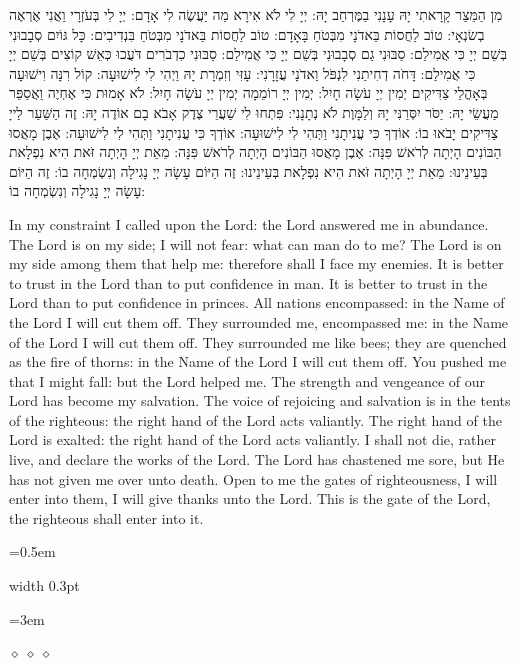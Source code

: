\documentclass[11pt, openany]{book}
\newlength{\bidiHebWidth}
\newlength{\bidiEngWidth}
\newenvironment{bilingual}{%
  \par\vspace{4pt}%
}{%
  \noindent
  \begin{minipage}[t]{\bidiEngWidth}
    \setstretch{1.4}\emergencystretch=0.5em\normalsize
    \usebox{\bidiEngBox}
  \end{minipage}%
  \hfill
  {\color{sedergold}\vrule width 0.3pt}%
  \hfill
  \begin{minipage}[t]{\bidiHebWidth}
    \begingroup\hebrewfont\TeXXeTstate=1\beginR
    \large\setstretch{1.4}\emergencystretch=3em\tolerance=9999\parindent=0pt\relax
    \usebox{\bidiHebBox}
    \endR\endgroup
  \end{minipage}%
  \par\vspace{2pt}%
}
\newenvironment{hebrewcol}{%
  \begin{lrbox}{\bidiHebBox}\begin{minipage}{\bidiHebWidth}%
}{%
  \end{minipage}\end{lrbox}%
}
\newenvironment{englishcol}{%
  \begin{lrbox}{\bidiEngBox}\begin{minipage}{\bidiEngWidth}%
}{%
  \end{minipage}\end{lrbox}%
}
\newcommand{\parasep}{%
  \par\vspace{3pt}
  \begin{center}
    \textcolor{sedergold!50}{\tiny$\diamond\;\diamond\;\diamond$}
  \end{center}
  \par\vspace{3pt}
}
\begin{document}
\begin{bilingual}
\begin{hebrewcol}
מִן הַמֵּצַר קָרָאתִי יָהּ עָנָנִי בַמֶּרְחַב יָהּ: יְיָ לִי לֹא אִירָא מַה יַּעֲשֶׂה לִי אָדָם: יְיָ לִי בְּעֹזְרָי וַאֲנִי אֶרְאֶה בְשׂנְאָי: טוֹב לַחֲסוֹת בַּאדֹנָי מִבְּטֹחַ בָּאָדָם: טוֹב לַחֲסוֹת בַּאדֹנָי מִבְּטֹחַ בִּנְדִיבִים: כָּל גּוֹיִם סְבָבוּנִי בְּשֵׁם יְיָ כִּי אֲמִילַם: סַבּוּנִי גַם סְבָבוּנִי בְּשֵׁם יְיָ כִּי אֲמִילַם: סַבּוּנִי כִדְבֹרִים דֹּעֲכוּ כְּאֵשׁ קוֹצִים בְּשֵׁם יְיָ כִּי אֲמִילַם: דָּחֹה דְחִיתַנִי לִנְפֹּל וַאדֹנָי עֲזָרָנִי: עָזִּי וְזִמְרָת יָהּ וַיְהִי לִי לִישׁוּעָה: קוֹל רִנָּה וִישׁוּעָה בְּאָהֳלֵי צַדִּיקִים יְמִין יְיָ עֹשָׂה חָיִל: יְמִין יְיָ רוֹמֵמָה יְמִין יְיָ עֹשָׂה חָיִל: לֹא אָמוּת כִּי אֶחְיֶה וַאֲסַפֵּר מַעֲשֵׂי יָהּ: יַסֹּר יִסְּרַנִּי יָהּ וְלַמָּוֶת לֹא נְתָנָנִי: פִּתְחוּ לִי שַׁעֲרֵי צֶדֶק אָבֹא בָם אוֹדֶה יָהּ: זֶה הַשַּׁעַר לַייָ צַדִּיקִים יָבֹאוּ בוֹ: אוֹדְךָ כִּי עֲנִיתָנִי וַתְּהִי לִי לִישׁוּעָה: אוֹדְךָ כִּי עֲנִיתָנִי וַתְּהִי לִי לִישׁוּעָה: אֶבֶן מָאֲסוּ הַבּוֹנִים הָיְתָה לְרֹאשׁ פִּנָּה: אֶבֶן מָאֲסוּ הַבּוֹנִים הָיְתָה לְרֹאשׁ פִּנָּה: מֵאֵת יְיָ הָיְתָה זֹּאת הִיא נִפְלָאת בְּעֵינֵינוּ: מֵאֵת יְיָ הָיְתָה זֹּאת הִיא נִפְלָאת בְּעֵינֵינוּ: זֶה הַיּוֹם עָשָׂה יְיָ נָגִילָה וְנִשְׂמְחָה בוֹ: זֶה הַיּוֹם עָשָׂה יְיָ נָגִילָה וְנִשְׂמְחָה בוֹ:
\end{hebrewcol}
\begin{englishcol}
In my constraint I called upon the Lord: the Lord answered me in abundance. The Lord is on my side; I will not fear: what can man do to me? The Lord is on my side among them that help me: therefore shall I face my enemies. It is better to trust in the Lord than to put confidence in man. It is better to trust in the Lord than to put confidence in princes. All nations encompassed: in the Name of the Lord I will cut them off. They surrounded me, encompassed me: in the Name of the Lord I will cut them off. They surrounded me like bees; they are quenched as the fire of thorns: in the Name of the Lord I will cut them off. You pushed me that I might fall: but the Lord helped me. The strength and vengeance of our Lord has become my salvation. The voice of rejoicing and salvation is in the tents of the righteous: the right hand of the Lord acts valiantly. The right hand of the Lord is exalted: the right hand of the Lord acts valiantly. I shall not die, rather live, and declare the works of the Lord. The Lord has chastened me sore, but He has not given me over unto death. Open to me the gates of righteousness, I will enter into them, I will give thanks unto the Lord. This is the gate of the Lord, the righteous shall enter into it.
\end{englishcol}
\end{bilingual}
\parasep
\end{document}
